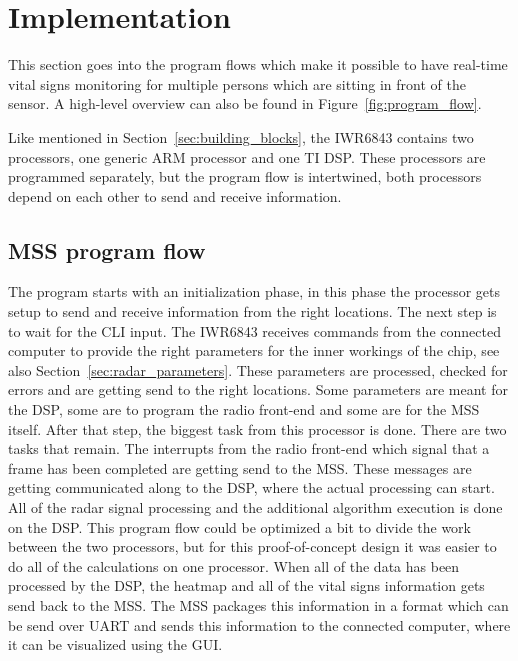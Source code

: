 \section{Implementation}
This section goes into the program flows which make it possible to have real-time vital signs monitoring for multiple persons which are sitting in front of the sensor. A high-level overview can also be found in Figure~\ref{fig:program_flow}.

Like mentioned in Section~\ref{sec:building_blocks}, the IWR6843 contains two processors, one generic ARM processor and one TI DSP. These processors are programmed separately, but the program flow is intertwined, both processors depend on each other to send and receive information. 

\subsection{MSS program flow}
The program starts with an initialization phase, in this phase the processor gets setup to send and receive information from the right locations. The next step is to wait for the CLI input. The IWR6843 receives commands from the connected computer to provide the right parameters for the inner workings of the chip, see also Section~\ref{sec:radar_parameters}. These parameters are processed, checked for errors and are getting send to the right locations. Some parameters are meant for the DSP, some are to program the radio front-end and some are for the MSS itself. After that step, the biggest task from this processor is done. There are two tasks that remain. The interrupts from the radio front-end which signal that a frame has been completed are getting send to the MSS. These messages are getting communicated along to the DSP, where the actual processing can start. All of the radar signal processing and the additional algorithm execution is done on the DSP. This program flow could be optimized a bit to divide the work between the two processors, but for this proof-of-concept design it was easier to do all of the calculations on one processor. When all of the data has been processed by the DSP, the heatmap and all of the vital signs information gets send back to the MSS. The MSS packages this information in a format which can be send over UART and sends this information to the connected computer, where it can be visualized using the GUI.

